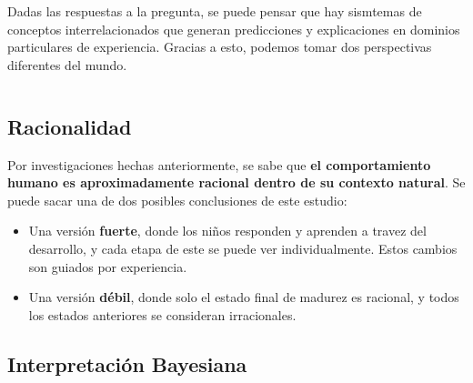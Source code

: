 \documentclass{beamer}
\begin{document}
\begin{frame}[fragile]
Dadas las respuestas a la pregunta, se puede pensar que hay sismtemas de conceptos interrelacionados que generan predicciones y explicaciones en dominios particulares de experiencia\cite{murphy93}. Gracias a esto, podemos tomar dos perspectivas diferentes del mundo.

\vspace{2em}

\begin{columns}[T]
\begin{column}{.4\textwidth}
\end{column}

\begin{column}{.5\textwidth}
\end{column}
\end{columns}

\end{frame}

\subsection{Racionalidad}

\begin{frame}[fragile]
Por investigaciones hechas anteriormente, se sabe que \textbf{el comportamiento humano es aproximadamente racional dentro de su contexto natural}\cite{anterson90}. Se puede sacar una de dos posibles conclusiones de este estudio:

\begin{itemize}
\item Una versión \textbf{fuerte}, donde los niños responden y aprenden a travez del desarrollo, y cada etapa de este se puede ver individualmente. Estos cambios son guiados por experiencia.
\item Una versión \textbf{débil}, donde solo el estado final de madurez es racional, y todos los estados anteriores se consideran irracionales.
\end{itemize}

\end{frame}

\subsection{Interpretación Bayesiana}
\end{document}
